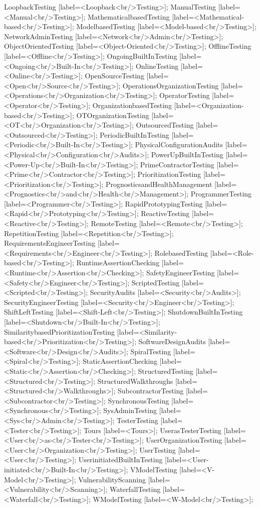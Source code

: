 \documentclass{article}
\begin{document}
{LoopbackTesting [label=<Loopback<br/>Testing>];
ManualTesting [label=<Manual<br/>Testing>];
MathematicalbasedTesting [label=<Mathematical-based<br/>Testing>];
ModelbasedTesting [label=<Model-based<br/>Testing>];
NetworkAdminTesting [label=<Network<br/>Admin<br/>Testing>];
ObjectOrientedTesting [label=<Object-Oriented<br/>Testing>];
OfflineTesting [label=<Offline<br/>Testing>];
OngoingBuiltInTesting [label=<Ongoing<br/>Built-In<br/>Testing>];
OnlineTesting [label=<Online<br/>Testing>];
OpenSourceTesting [label=<Open<br/>Source<br/>Testing>];
OperationsOrganizationTesting [label=<Operations<br/>Organization<br/>Testing>];
OperatorTesting [label=<Operator<br/>Testing>];
OrganizationbasedTesting [label=<Organization-based<br/>Testing>];
OTOrganizationTesting [label=<OT<br/>Organization<br/>Testing>];
OutsourcedTesting [label=<Outsourced<br/>Testing>];
PeriodicBuiltInTesting [label=<Periodic<br/>Built-In<br/>Testing>];
PhysicalConfigurationAudits [label=<Physical<br/>Configuration<br/>Audits>];
PowerUpBuiltInTesting [label=<Power-Up<br/>Built-In<br/>Testing>];
PrimeContractorTesting [label=<Prime<br/>Contractor<br/>Testing>];
PrioritizationTesting [label=<Prioritization<br/>Testing>];
PrognosticsandHealthManagement [label=<Prognostics<br/>and<br/>Health<br/>Management>];
ProgrammerTesting [label=<Programmer<br/>Testing>];
RapidPrototypingTesting [label=<Rapid<br/>Prototyping<br/>Testing>];
ReactiveTesting [label=<Reactive<br/>Testing>];
RemoteTesting [label=<Remote<br/>Testing>];
RepetitionTesting [label=<Repetition<br/>Testing>];
RequirementsEngineerTesting [label=<Requirements<br/>Engineer<br/>Testing>];
RolebasedTesting [label=<Role-based<br/>Testing>];
RuntimeAssertionChecking [label=<Runtime<br/>Assertion<br/>Checking>];
SafetyEngineerTesting [label=<Safety<br/>Engineer<br/>Testing>];
ScriptedTesting [label=<Scripted<br/>Testing>];
SecurityAudits [label=<Security<br/>Audits>];
SecurityEngineerTesting [label=<Security<br/>Engineer<br/>Testing>];
ShiftLeftTesting [label=<Shift-Left<br/>Testing>];
ShutdownBuiltInTesting [label=<Shutdown<br/>Built-In<br/>Testing>];
SimilaritybasedPrioritizationTesting [label=<Similarity-based<br/>Prioritization<br/>Testing>];
SoftwareDesignAudits [label=<Software<br/>Design<br/>Audits>];
SpiralTesting [label=<Spiral<br/>Testing>];
StaticAssertionChecking [label=<Static<br/>Assertion<br/>Checking>];
StructuredTesting [label=<Structured<br/>Testing>];
StructuredWalkthroughs [label=<Structured<br/>Walkthroughs>];
SubcontractorTesting [label=<Subcontractor<br/>Testing>];
SynchronousTesting [label=<Synchronous<br/>Testing>];
SysAdminTesting [label=<Sys<br/>Admin<br/>Testing>];
TesterTesting [label=<Tester<br/>Testing>];
Tours [label=<Tours>];
UserasTesterTesting [label=<User<br/>as<br/>Tester<br/>Testing>];
UserOrganizationTesting [label=<User<br/>Organization<br/>Testing>];
UserTesting [label=<User<br/>Testing>];
UserinitiatedBuiltInTesting [label=<User-initiated<br/>Built-In<br/>Testing>];
VModelTesting [label=<V-Model<br/>Testing>];
VulnerabilityScanning [label=<Vulnerability<br/>Scanning>];
WaterfallTesting [label=<Waterfall<br/>Testing>];
WModelTesting [label=<W-Model<br/>Testing>];


}
\end{document}
